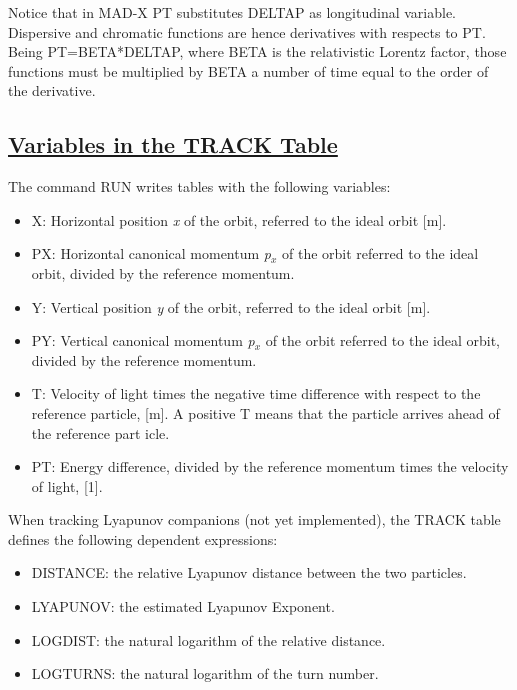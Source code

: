 Notice that in MAD-X PT substitutes DELTAP as longitudinal
variable. Dispersive and chromatic functions are hence derivatives with
respects to PT. Being PT=BETA*DELTAP, where BETA is the relativistic
Lorentz factor, those functions must be multiplied by BETA a number of
time equal to the order of the derivative.  

\subsection{\href{track}{Variables in the TRACK Table}} 
\label{subsec:tables_track}
The command RUN writes tables with the following variables: 
\begin{itemize}
   \item X: Horizontal position \textit{x} of the orbit, referred to the
     ideal orbit [m].    
   \item PX: Horizontal canonical momentum \textit{p$_x$} of the orbit
     referred to the ideal orbit, divided by the reference momentum.    
   \item Y: Vertical position \textit{y} of the orbit, referred to the
     ideal orbit [m].    
   \item PY: Vertical canonical momentum \textit{p$_x$} of the orbit
     referred to the ideal orbit, divided by the reference momentum.    
   \item T: Velocity of light times the negative time difference with
     respect to the reference particle, [m]. A positive T means that the
     particle arrives ahead of the reference part icle.   
   \item PT: Energy difference, divided by the reference momentum times
     the velocity of light, [1].    
\end{itemize} 

When tracking Lyapunov companions (not yet implemented), the TRACK table
defines the following dependent expressions:  
\begin{itemize}
   \item DISTANCE: the relative Lyapunov distance between the two
     particles.    
   \item LYAPUNOV: the estimated Lyapunov Exponent.   
   \item LOGDIST: the natural logarithm of the relative distance.   
   \item LOGTURNS: the natural logarithm of the turn number.   
\end{itemize}


